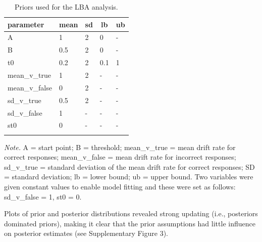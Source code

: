 \documentclass[
  man,floatsintext]{apa6}
\begin{document}
\begin{table}[tbp]

\begin{center}
\begin{threeparttable}

\caption{\label{tab:prior-lba-table}Priors used for the LBA analysis.}

\begin{tabular}{lllll}
\toprule
parameter & \multicolumn{1}{c}{mean} & \multicolumn{1}{c}{sd} & \multicolumn{1}{c}{lb} & \multicolumn{1}{c}{ub}\\
\midrule
A & 1 & 2 & 0 & -\\
B & 0.5 & 2 & 0 & -\\
t0 & 0.2 & 2 & 0.1 & 1\\
mean\_v\_true & 1 & 2 & - & -\\
mean\_v\_false & 0 & 2 & - & -\\
sd\_v\_true & 0.5 & 2 & - & -\\
sd\_v\_false & 1 & - & - & -\\
st0 & 0 & - & - & -\\
\bottomrule
\addlinespace
\end{tabular}

\begin{tablenotes}[para]
\normalsize{\textit{Note.} A = start point; B = threshold; mean\_v\_true = mean drift rate for correct responses; mean\_v\_false = mean drift rate for incorrect responses; sd\_v\_true = standard deviation of the mean drift rate for correct responses; SD = standard deviation; lb = lower bound; ub = upper bound. Two variables were given constant values to enable model fitting and these were set as follows: sd\_v\_false = 1, st0 = 0.}
\end{tablenotes}

\end{threeparttable}
\end{center}

\end{table}

\newpage

Plots of prior and posterior distributions revealed strong updating (i.e., posteriors dominated priors), making it clear that the prior assumptions had little influence on posterior estimates (see Supplementary Figure 3).
\end{document}
